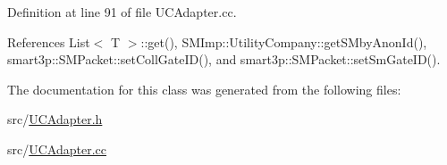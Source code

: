 Definition at line 91 of file U\+C\+Adapter.\+cc.



References List$<$ T $>$\+::get(), S\+M\+Imp\+::\+Utility\+Company\+::get\+S\+Mby\+Anon\+Id(), smart3p\+::\+S\+M\+Packet\+::set\+Coll\+Gate\+I\+D(), and smart3p\+::\+S\+M\+Packet\+::set\+Sm\+Gate\+I\+D().



The documentation for this class was generated from the following files\+:\begin{DoxyCompactItemize}
\item 
src/\hyperlink{UCAdapter_8h}{U\+C\+Adapter.\+h}\item 
src/\hyperlink{UCAdapter_8cc}{U\+C\+Adapter.\+cc}\end{DoxyCompactItemize}
